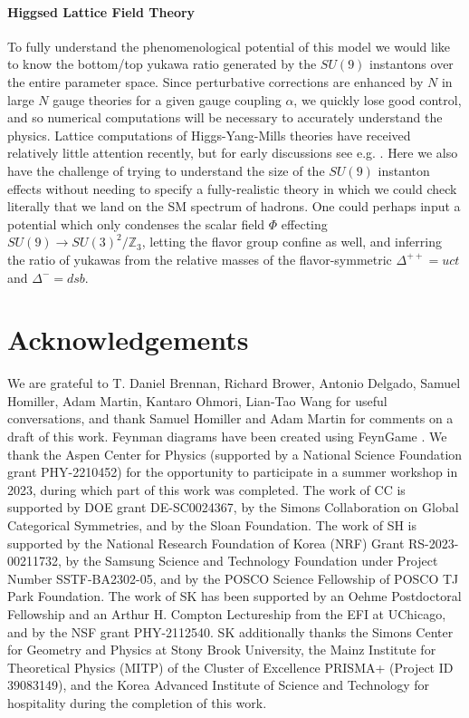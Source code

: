 \documentclass[11pt,a4paper]{article}
\begin{document}
\paragraph{Higgsed Lattice Field Theory} 
To fully understand the phenomenological potential of this model we would like to know the bottom/top yukawa ratio generated by the $SU(9)$ instantons over the entire parameter space. Since perturbative corrections are enhanced by $N$ in large $N$ gauge theories for a given gauge coupling $\alpha$, we quickly lose good control, and so numerical computations will be necessary to accurately understand the physics.
Lattice computations of Higgs-Yang-Mills theories have received relatively little attention recently, but for early discussions see e.g. \cite{Brower:1982yn,Lee:1985yi,Shrock:1987bx}.
Here we also have the challenge of trying to understand the size of the $SU(9)$ instanton effects without needing to specify a fully-realistic theory in which we could check literally that we land on the SM spectrum of hadrons. 
One could perhaps input a potential which only condenses the scalar field $\Phi$ effecting $SU(9) \rightarrow SU(3)^2/\mathbb{Z}_3$, letting the flavor group confine as well, and inferring the ratio of yukawas from the relative masses of the flavor-symmetric $\Delta^{++} = uct$ and $\Delta^{-} = dsb$. 

\section*{Acknowledgements}

We are grateful to T. Daniel Brennan, Richard Brower, Antonio Delgado, Samuel Homiller, Adam Martin, Kantaro Ohmori, Lian-Tao Wang for useful conversations, and thank Samuel Homiller and Adam Martin for comments on a draft of this work. 
Feynman diagrams have been created using FeynGame \cite{Harlander:2020cyh}.
We thank the Aspen Center for Physics (supported by a National Science Foundation grant
PHY-2210452) for the opportunity to participate in a summer workshop in 2023, during
which part of this work was completed. 
The work of CC is supported by DOE grant DE-SC0024367, by the Simons Collaboration on Global Categorical Symmetries, and by the Sloan Foundation. 
The work of SH is supported by the National Research Foundation of Korea (NRF) Grant RS-2023-00211732, by the Samsung Science and Technology Foundation under Project Number SSTF-BA2302-05, and by the POSCO Science Fellowship of POSCO TJ Park Foundation. The work of SK has been supported by an Oehme
Postdoctoral Fellowship and an Arthur H. Compton Lectureship from the EFI at UChicago, and by the NSF grant PHY-2112540. 
SK additionally thanks the Simons Center for Geometry and Physics at Stony Brook University, the Mainz Institute for Theoretical Physics (MITP) of the Cluster of Excellence PRISMA+ (Project ID 39083149), and the Korea Advanced Institute of Science and Technology for hospitality during the completion of this work.
\end{document}
